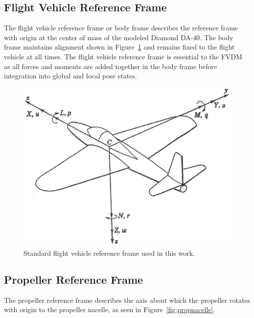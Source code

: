 \documentclass[12pt]{report}
\begin{document}
\subsection{Flight Vehicle Reference Frame}
The flight vehicle reference frame or body frame describes the reference frame with origin at the center of mass of the modeled Diamond DA-40. The body frame maintains alignment shown in Figure~\ref{fig:flightvehiclereferenceframe} and remains fixed to the flight vehicle at all times. The flight vehicle reference frame is essential to the FVDM as all forces and moments are added together in the body frame before integration into global and local pose states.

\begin{figure}[!ht]\label{fig:flightvehiclereferenceframe}
  \centering
  \includegraphics[width=0.85\linewidth]{Figures/bodyframe.png}
  \caption{Standard flight vehicle reference frame used in this work.~\cite{peetSpacecraftAircraftDynamics}}
\end{figure}

\subsection{Propeller Reference Frame}
The propeller reference frame describes the axis about which the propeller rotates with origin to the propeller nacelle, as seen in Figure~\ref{fig:propnacelle}.
\end{document}
